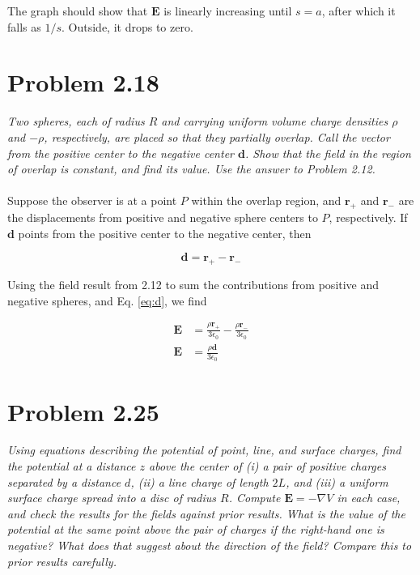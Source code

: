 \documentclass[10pt]{article}
\begin{document}
The graph should show that $\mathbf{E}$ is linearly increasing until $s = a$, after which it falls as $1/s$.  Outside, it drops to zero.

\section{Problem 2.18}

\textit{Two spheres, each of radius $R$ and carrying uniform volume charge densities $\rho$ and $-\rho$, respectively, are placed so that they partially overlap.  Call the vector from the positive center to the negative center $\mathbf{d}$.  Show that the field in the region of overlap is constant, and find its value.  Use the answer to Problem 2.12.} \\ \\

Suppose the observer is at a point $P$ within the overlap region, and $\mathbf{r}_{+}$ and $\mathbf{r}_{-}$ are the displacements from positive and negative sphere centers to $P$, respectively.  If $\mathbf{d}$ points from the positive center to the negative center, then

\begin{equation}
\mathbf{d} = \mathbf{r}_{+} - \mathbf{r}_{-} \label{eq:d}
\end{equation}

Using the field result from 2.12 to sum the contributions from positive and negative spheres, and Eq. \ref{eq:d}, we find

\begin{align}
\mathbf{E} &= \frac{\rho\mathbf{r}_{+}}{3\epsilon_0} - \frac{\rho\mathbf{r}_{-}}{3\epsilon_0} \\
\mathbf{E} &= \frac{\rho\mathbf{d}}{3\epsilon_0}
\end{align}

\section{Problem 2.25}

\textit{Using equations describing the potential of point, line, and surface charges, find the potential at a distance $z$ above the center of (i) a pair of positive charges separated by a distance $d$, (ii) a line charge of length $2L$, and (iii) a uniform surface charge spread into a disc of radius $R$.  Compute $\mathbf{E} = -\nabla V$ in each case, and check the results for the fields against prior results.  What is the value of the potential at the same point above the pair of charges if the right-hand one is negative?  What does that suggest about the direction of the field?  Compare this to prior results carefully.} \\ \\
\end{document}
